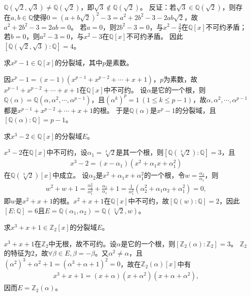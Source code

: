 \documentclass[../../main.tex]{subfiles}%
\begin{document}
\begin{remark}
$\mathbb{Q}(\sqrt{2},\sqrt{3})\neq\mathbb{Q}(\sqrt{2})$，即$\sqrt{3}\notin\mathbb{Q}(\sqrt{2})$。
反证：若$\sqrt{3}\in\mathbb{Q}(\sqrt{2})$，则存在$a,b\in\mathbb{Q}$使得$0=(a+b\sqrt{2})^2-3=a^2+2b^2-3-2ab\sqrt{2}$，故$a^2+2b^2-3=2ab=0$。
若$a=0$，则$2b^2-3=0$，与$x^2-\frac{3}{2}$在$\mathbb{Q}[x]$不可约矛盾；若$b=0$，则$a^2-3=0$，与$x^2-3$在$\mathbb{Q}[x]$不可约矛盾。
因此$[\mathbb{Q}(\sqrt{2},\sqrt{3}):\mathbb{Q}]=4$。
\end{remark}

\begin{example}
求$x^p-1\in\mathbb{Q}[x]$的分裂域，其中$p$是素数。
\end{example}
\begin{solution}
因$x^p-1=(x-1)(x^{p-1}+x^{p-2}+\cdots+x+1)$，$p$为素数，故$x^{p-1}+x^{p-2}+\cdots+x+1$在$\mathbb{Q}[x]$中不可约。
设$\alpha$是它的一个根，则$\mathbb{Q}(\alpha)=\mathbb{Q}(\alpha,\alpha^2,\cdots,\alpha^{p-1})$，且$(\alpha^k)^p=1\ (1\leqslant k\leqslant p-1)$，故$\alpha,\alpha^2,\cdots,\alpha^{p-1}$都是$x^{p-1}+x^{p-2}+\cdots+x+1$的根。
于是$\mathbb{Q}(\alpha)$是$x^p-1$的分裂域，且$[\mathbb{Q}(\alpha):\mathbb{Q}]=p-1$。

\end{solution}

\begin{example}
求$x^3-2\in\mathbb{Q}[x]$的分裂域$E$。
\end{example}
\begin{solution}
$x^3-2$在$\mathbb{Q}[x]$中不可约，设$\alpha_1=\sqrt[3]{2}$是其一个根，则$[\mathbb{Q}(\sqrt[3]{2}):\mathbb{Q}]=3$，且
\begin{align*}
x^3-2=(x-\alpha_1)(x^2+\alpha_1x+\alpha_1^2)
\end{align*}
在$\mathbb{Q}(\sqrt[3]{2})[x]$中成立。
设$\alpha_2$是$x^2+\alpha_1x+\alpha_1^2$的一个根，令$w=\frac{\alpha_2}{\alpha_1}$，则
\begin{align*}
w^2+w+1=\frac{\alpha_2^2}{\alpha_1^2}+\frac{\alpha_2}{\alpha_1}+1
=\frac{1}{\alpha_1^2}(\alpha_2^2+\alpha_1\alpha_2+\alpha_1^2)=0,
\end{align*}
即$w$是$x^2+x+1$的根。$x^2+x+1$在$\mathbb{Q}[x]$中不可约，故$[\mathbb{Q}(w):\mathbb{Q}]=2$，因此$[E:\mathbb{Q}]=6$且$E=\mathbb{Q}(\alpha_1,\alpha_2)=\mathbb{Q}(\sqrt[3]{2},w)$。

\end{solution}

\begin{example}
求$x^3+x+1\in\mathbb{Z}_2[x]$的分裂域$E$。
\end{example}
\begin{solution}
$x^3+x+1$在$\mathbb{Z}_2$中无根，故不可约。设$\alpha$是它的一个根，则$[\mathbb{Z}_2(\alpha):\mathbb{Z}_2]=3$。
$\mathbb{Z}_2$的特征为$2$，故$\forall\beta\in E,\beta=-\beta$。又$\alpha^2\neq\alpha$，且$(\alpha^2)^3+\alpha^2+1=(\alpha^3+\alpha+1)^2=0$，故在$\mathbb{Z}_2(\alpha)[x]$中有
\begin{align*}
x^3+x+1=(x+\alpha)(x+\alpha^2)(x+\alpha+\alpha^2),
\end{align*}
因而$E=\mathbb{Z}_2(\alpha)$。

\end{solution}
\end{document}
